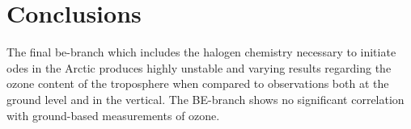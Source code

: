 \setcounter{chapter}{7}
\chapter{Conclusions}\label{Chap:conclusion}

The final \acrlong{be}-branch which includes the halogen chemistry necessary to initiate \acrlong{ode}s in the Arctic produces highly unstable and varying results regarding the ozone content of the troposphere when compared to observations both at the ground level and in the vertical. The BE-branch shows no significant correlation with ground-based measurements of ozone. 